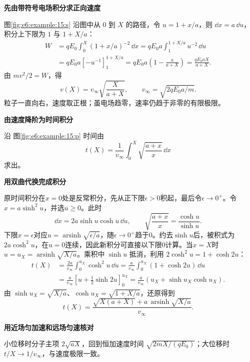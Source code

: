 \begin{solution}\textbf{先由带符号电场积分求正向速度}\par\nobreak
图\ref{fig:e6:example:15:s} 沿图中从 $0$ 到 $X$ 的路径，令 $u=1+x/a$，则 $\dd x=a\,\dd u$，积分上下限为 $1$ 与 $1+X/a$：
\begin{align*}
W&=qE_0\int_0^X(1+x/a)^{-2}\,\dd x
=qE_0a\int_1^{1+X/a}u^{-2}\,\dd u\\
&=qE_0a[-u^{-1}]_1^{1+X/a}
=qE_0a\left(1-\frac{a}{a+X}\right)
=\frac{qE_0aX}{a+X}.
\end{align*}
由 $mv^2/2=W$，得
\[
 v(X)=v_\infty\sqrt{\frac X{a+X}},\qquad
 v_\infty=\sqrt{2qE_0a/m}.
\]
粒子一直向右，速度取正根；虽电场趋零，速率仍趋于非零的有限极限。



\par\medskip{}\noindent\textbf{由速度降阶为时间积分}\par\nobreak
沿 图\ref{fig:e6:example:15:p} 时间由
\[
 t(X)=\frac1{v_\infty}\int_0^X\sqrt{\frac{a+x}{x}}\,\dd x
\]
求出。

\par\medskip{}\noindent\textbf{用双曲代换完成积分}\par\nobreak
原时间积分在$x=0$处是反常积分，先从正下限$\epsilon>0$积起，最后令$\epsilon\to0^+$。令$x=a\sinh^2u$，并选$u\ge0$。此时
\[
\dd x=2a\sinh u\cosh u\,\dd u,\qquad
\sqrt{\frac{a+x}{x}}=\frac{\cosh u}{\sinh u}.
\]
下限$x=\epsilon$对应$u=\operatorname{arsinh}\sqrt{\epsilon/a}$，随$\epsilon\to0^+$趋于0。约去$\sinh u$后，被积式为$2a\cosh^2u$，在$u=0$连续，因此新积分可直接以下限0计算。当$x=X$时
$u=u_X=\operatorname{arsinh}\sqrt{X/a}$。乘积中 $\sinh u$ 抵消，利用 $2\cosh^2u=1+\cosh2u$：
\begin{align*}
t(X)&=\frac{2a}{v_\infty}\int_0^{u_X}\cosh^2u\,\dd u
=\frac{a}{v_\infty}\int_0^{u_X}(1+\cosh2u)\,\dd u\\
&=\frac{a}{v_\infty}\left[u+\frac12\sinh2u\right]_0^{u_X}
=\frac{a}{v_\infty}(u_X+\sinh u_X\cosh u_X).
\end{align*}
由 $\sinh u_X=\sqrt{X/a}$、$\cosh u_X=\sqrt{1+X/a}$，还原得到
\[
 t(X)=\frac{\sqrt{X(a+X)}+a\,\operatorname{arsinh}\sqrt{X/a}}{v_\infty}.
\]


\par\medskip{}\noindent\textbf{用近场匀加速和远场匀速核对}\par\nobreak
小位移时分子主项 $2\sqrt{aX}$，回到恒加速度时间 $\sqrt{2mX/(qE_0)}$；大位移时 $t/X\to1/v_\infty$，与速度极限一致。\end{solution}
